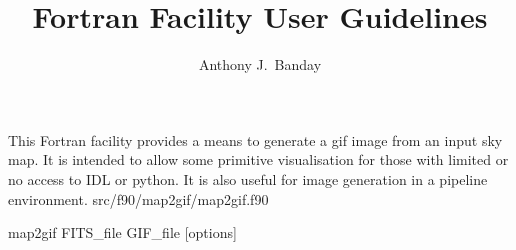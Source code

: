 
\sloppy


\title{\healpix Fortran Facility User Guidelines}
 \section[map2gif]{\nosectionname}
\label{fac:map2gif}
\author{Anthony J.~Banday}

\begin{facility}
{This Fortran facility provides a means to generate a
gif image from an input \healpix sky map. It is intended to allow some
primitive visualisation for those with limited or no access to IDL or python. 
It is also useful for image generation in a pipeline environment.}
{src/f90/map2gif/map2gif.f90}
\end{facility}

\begin{f90facility}
{map2gif 
 FITS\_file 
 GIF\_file [options]}
\end{f90facility}

